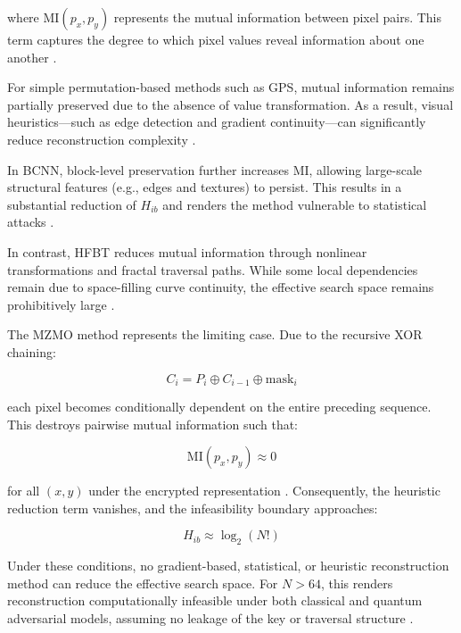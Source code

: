 \documentclass[12pt,fleqn]{article}
\begin{document}
where $\text{MI}(p_x, p_y)$ represents the mutual information between pixel pairs. This term captures the degree to which pixel values reveal information about one another \cite{cover2005elements}.

For simple permutation-based methods such as GPS, mutual information remains partially preserved due to the absence of value transformation. As a result, visual heuristics—such as edge detection and gradient continuity—can significantly reduce reconstruction complexity \cite{li2011multimedia}.

In BCNN, block-level preservation further increases $\text{MI}$, allowing large-scale structural features (e.g., edges and textures) to persist. This results in a substantial reduction of $H_{ib}$ and renders the method vulnerable to statistical attacks \cite{yaroslavsky2011linking}.

In contrast, HFBT reduces mutual information through nonlinear transformations and fractal traversal paths. While some local dependencies remain due to space-filling curve continuity, the effective search space remains prohibitively large \cite{zhang2019maps}.

The MZMO method represents the limiting case. Due to the recursive XOR chaining:

\begin{equation}
C_i = P_i \oplus C_{i-1} \oplus \text{mask}_i
\end{equation}

each pixel becomes conditionally dependent on the entire preceding sequence. This destroys pairwise mutual information such that:

\begin{equation}
\text{MI}(p_x, p_y) \approx 0
\end{equation}

for all $(x,y)$ under the encrypted representation \cite{stinson1995cryptography}. Consequently, the heuristic reduction term vanishes, and the infeasibility boundary approaches:

\begin{equation}
H_{ib} \approx \log_2(N!)
\end{equation}

Under these conditions, no gradient-based, statistical, or heuristic reconstruction method can reduce the effective search space. For $N > 64$, this renders reconstruction computationally infeasible under both classical and quantum adversarial models, assuming no leakage of the key or traversal structure \cite{bernstein2017post}.
\end{document}
